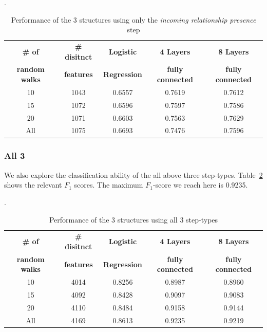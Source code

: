 \documentclass[runningheads,a4paper]{IEEEtran}
\begin{document}
\begin{table}[h]
\centering
\caption{Performance of the 3 structures using only the \textit{incoming relationship presence} step}
\label{tab:inRel}.
  \begin{tabular}{ | c | c | c | c | c |}
    \hline
     \textbf{\# of}  & \textbf{\# disitnct} & \textbf{Logistic } & \textbf{4 Layers} & \textbf{8 Layers} \\
    \textbf{random walks} &\textbf{features} &\textbf{ Regression} & \textbf{fully connected} & \textbf{fully connected}\\
    \hline
    10 & 1043 & 0.6557& 0.7619 & 0.7612\\
    \hline
    15 & 1072 & 0.6596 & 0.7597& 0.7586\\
    \hline
    20 & 1071 & 0.6603 & 0.7563 & 0.7629\\
    \hline
    All & 1075 & 0.6693 & 0.7476 & 0.7596\\
    \hline
  \end{tabular}
\end{table}

\subsubsection{All 3} 
We also explore the classification ability of the all above three step-types. Table~\ref{tab:all3} shows the relevant $F_1$ scores. The maximum $F_1$-score we reach here is 0.9235.
\begin{table}[h]
\centering
\caption{Performance of the 3 structures using all 3 step-types}
\label{tab:all3}.
  \begin{tabular}{ | c | c | c | c | c |}
    \hline
     \textbf{\# of}  & \textbf{\# disitnct} & \textbf{Logistic } & \textbf{4 Layers} & \textbf{8 Layers} \\
    \textbf{random walks} &\textbf{features} &\textbf{ Regression} & \textbf{fully connected} & \textbf{fully connected}\\
    \hline
    10 & 4014 & 0.8256 & 0.8987 & 0.8960\\
    \hline
    15 & 4092 & 0.8428 & 0.9097& 0.9083\\
    \hline
    20 & 4110 & 0.8484 & 0.9158 & 0.9144\\
    \hline
    All & 4169 & 0.8613 & 0.9235 & 0.9219\\
    \hline
  \end{tabular}
\end{table}
\end{document}
